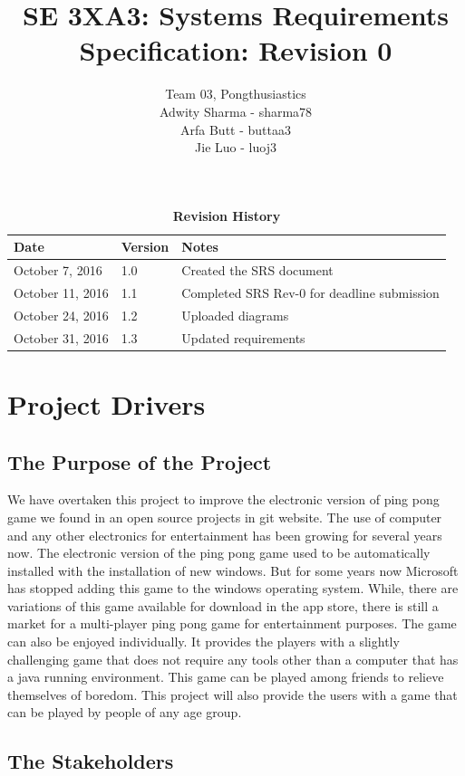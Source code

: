 \documentclass[12pt,letterpaper]{article}
\title{SE 3XA3: Systems Requirements Specification: Revision 0}
\author{Team 03, Pongthusiastics 		
\\ Adwity Sharma - sharma78 		
\\ Arfa Butt - buttaa3 	
	\\ Jie Luo - luoj3 }
\date{}
\begin{document}
\maketitle
\newpage
\tableofcontents

\listoftables
\listoffigures
\begin{table}[h]
\caption{\bf Revision History}
\begin{tabularx}{\textwidth}{p{3.5cm}p{2cm}X}
\toprule {\bf Date} & {\bf Version} & {\bf Notes}\\
\midrule
October 7, 2016 & 1.0 & Created the SRS document \\
October 11, 2016 & 1.1 & Completed SRS Rev-0 for deadline submission\\
October 24, 2016 & 1.2 & Uploaded diagrams \\
October 31, 2016 & 1.3 & Updated requirements \\

\bottomrule
\end{tabularx}
\end{table}

\newpage
	
	\section{Project Drivers}
	\subsection{The Purpose of the Project}
	We have overtaken this project to improve the electronic version of ping pong game we found in an open source projects in git website. The use of computer and any other electronics for entertainment has been growing for several years now. The electronic version of the ping pong game used to be automatically installed with the installation of new windows. But for some years now Microsoft has stopped adding this game to the windows operating system. While, there are variations of this game available for download in the app store, there is still a market for a multi-player ping pong game for entertainment purposes. The game can also be enjoyed individually. It provides the players with a slightly challenging game that does not require any tools other than a computer that has a java running environment. This game can be played among friends to relieve themselves of boredom. This project will also provide the users with a game that can be played by people of any age group. 
	
	\subsection{The Stakeholders}
\end{document}
